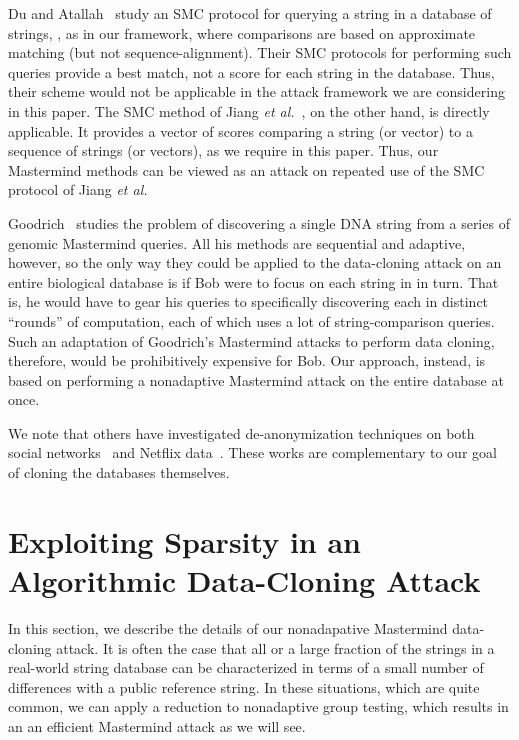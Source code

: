 \documentclass{article}
\begin{document}
Du and Atallah~\cite{da-psrda-01} study an SMC protocol
for querying a string  
in a database of strings, , as in our framework,
where comparisons are based on approximate
matching (but not sequence-alignment).
Their SMC protocols for performing such queries provide
a best match, not a score for each string in the database.
Thus, their scheme would not be applicable in the attack framework we are
considering in this paper.
The SMC method of Jiang {\it et al.}~\cite{jmcs-sddli-08}, on the other hand,
is directly applicable.
It provides a vector of scores comparing a string (or vector) 
 to a sequence of
strings (or vectors), as we require in this paper.
Thus, our Mastermind methods can be viewed as an attack on repeated use of the
SMC protocol of Jiang {\it et al.}

Goodrich~\cite{g-magd-09} studies the 
problem of discovering a single DNA string from 
a series of genomic Mastermind queries.
All his methods are sequential and adaptive, however, so the only way they
could be applied to the data-cloning attack on an entire biological database is
if Bob were to focus on each string  in  in turn. 
That is, he would have to gear his
queries to specifically discovering each  
in  distinct ``rounds''
of computation, each of which uses a lot of string-comparison queries. 
Such an adaptation of Goodrich's Mastermind attacks to perform data cloning,
therefore, would be
prohibitively expensive for Bob. 
Our approach, instead, is based on performing a nonadaptive Mastermind
attack on the entire database at once.

We note that others have investigated de-anonymization techniques on both
social networks~\cite{backstrom2007} and Netflix data~\cite{narayanan2008}.
These works are complementary to our goal of cloning the databases themselves.



\section{Exploiting Sparsity in an Algorithmic Data-Cloning Attack}
\label{sec:sparsity}
In this section, we describe the details of our nonadapative Mastermind data-cloning attack.
It is often the case that all or a large fraction of the strings in a
real-world string database can be 
characterized in terms of a small number of differences with a public
reference string. In these situations, which are quite common, we can
apply a reduction to nonadaptive group testing, which results in an
an efficient Mastermind attack as we will see.
\end{document}
